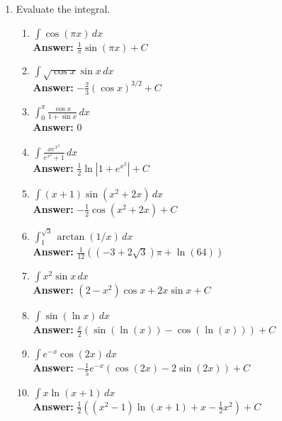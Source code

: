 \documentclass[letterpaper]{article}
\begin{document}
\begin{enumerate}

\item Evaluate the integral.
	\begin{enumerate}

	\item $\displaystyle\int \cos (\pi x) \,dx$
	\\ \textbf{Answer:} $\frac1\pi \sin(\pi x) +C$

	\item $\int \sqrt{\cos x}\sin x\, dx$
	\\ \textbf{Answer:} $-\frac23 (\cos x)^{3/2}+C$

	\item $\int_0^\pi \frac{\cos x}{1+\sin x}\,dx$ 
	\\ \textbf{Answer:} $0$

	\item $\displaystyle\int \frac{x e^{x^2}}{e^{x^2}+1}\, dx$
	\\ \textbf{Answer:} $\frac12 \ln\left|1+e^{x^2}\right|+C$

	\item $\displaystyle\int (x+1) \sin(x^2+2x)\, dx$
	\\ \textbf{Answer:} $-\frac12 \cos(x^2+2x)+C$

	\item $\displaystyle\int_1^{\sqrt{3}} \arctan(1/x)\,dx$
	\\ \textbf{Answer:} $\frac{1}{12} \left(\left(-3+2 \sqrt{3}\right) \pi +\ln(64)\right)$

	\item $\displaystyle\int x^2\sin x\,dx$
	\\ \textbf{Answer:} $(2-x^2)\cos x + 2x\sin x +C$

	\item $\displaystyle\int \sin(\ln x)\, dx$
	\\ \textbf{Answer:} $\frac x2 \left(\sin(\ln(x))-\cos(\ln(x))\right)+C$

	\item $\displaystyle\int e^{-x} \cos(2x)\, dx$
	\\ \textbf{Answer:} $-\frac15 e^{-x}(\cos (2x)-2\sin(2x))+C$

	\item $\displaystyle\int x\ln(x+1)\, dx$
	\\ \textbf{Answer:} $\frac12 ((x^2-1)\ln (x+1) +x-\frac12 x^2)+C$


\end{enumerate}
\end{enumerate}
\end{document}
